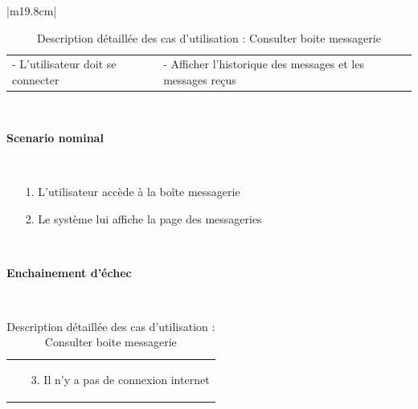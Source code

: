 \begin{table}[h]
\begin{tabular}{|m{19.8cm}|}
		\hline
		\begin{tabular}{m{9.3cm}|m{9.3cm}}
			- L’utilisateur doit se connecter \newline
			& 
			- Afficher  l'historique des  messages et les messages reçus
			\\[0ex]
		\end{tabular}
		\\
		\hline
		\begin{center}
			\textbf{Scenario nominal}
		\end{center}
		\\
		[-4ex]
		\hline
		\begin{enumerate}
			\item [1.] L’utilisateur accède à la boîte messagerie
			\item [2.] Le système lui affiche la page des messageries
		\end{enumerate}
		\\
		[-4ex]
		\hline	
		\begin{center}
			\textbf{Enchainement d’échec }
		\end{center}
		\\ 
		[-4ex]
		\hline
		\begin{tabular}{m{17.5cm}}
			\begin{enumerate}
				\item [3.] Il n’y a pas de connexion internet
				
			\end{enumerate}
			\\[-4ex]
		\end{tabular}
		\\
		\hline	
		
	\end{tabular}
	\vspace*{1.5cm}
	\centering \caption{Description détaillée des cas d'utilisation : Consulter boite messagerie}
	\label{4.1}
\end{table}


\newpage

